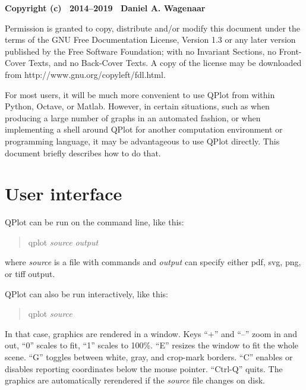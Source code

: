 \documentclass[11pt]{article}
\begin{document}
\begin{centering}
\medskip

\bigskip

\end{centering}

{\noindent\scriptsize\bf  Copyright (c) ~2014--2019 ~Daniel A. Wagenaar
  
\noindent Permission is granted to copy, distribute and/or modify this document
under the terms of the GNU Free Documentation License, Version 1.3 or
any later version published by the Free Software Foundation; with no
Invariant Sections, no Front-Cover Texts, and no Back-Cover Texts.  A
copy of the license may be downloaded from
http://www.gnu.org/copyleft/fdl.html.}\bigskip


\noindent For most users, it will be much more convenient to use QPlot from
within Python, Octave, or Matlab. However, in certain situations, such as when
producing a large number of graphs in an automated fashion, or when
implementing a shell around QPlot for another computation environment
or programming language, it may be advantageous to use QPlot
directly. This document briefly describes how to do that.

\section{User interface}

QPlot can be run on the command line, like this:
\begin{quotation}
qplot \emph{source} \emph{output}
\end{quotation}
 where \emph{source} is a file with commands and
\emph{output} can specify either pdf, svg, png, or tiff output.

QPlot can also be run interactively, like this:
\begin{quotation}
qplot \emph{source}
\end{quotation}
 In that case, graphics are rendered in a window. Keys ``+''
and ``--'' zoom in and out, ``0'' scales to fit, ``1'' scales to
100\%. ``E'' resizes the window to fit the whole scene. ``G'' toggles
between white, gray, and crop-mark borders. ``C'' enables or disables reporting
coordinates below the mouse pointer. ``Ctrl-Q'' quits. The graphics are
automatically rerendered if the \emph{source}
file changes on disk.
\end{document}

